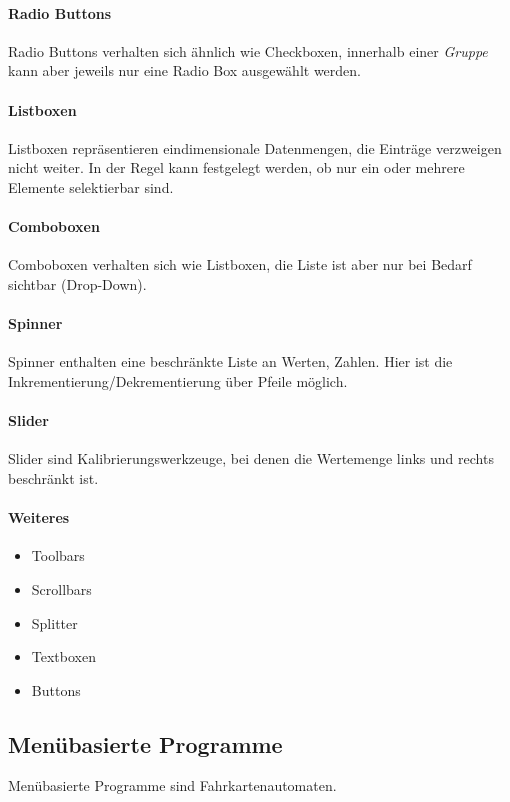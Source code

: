 					\paragraph{Radio Buttons}
						Radio Buttons verhalten sich ähnlich wie Checkboxen, innerhalb einer \emph{Gruppe} kann aber jeweils nur eine Radio Box ausgewählt werden.

					\paragraph{Listboxen}
						Listboxen repräsentieren eindimensionale Datenmengen, \dh die Einträge verzweigen nicht weiter. In der Regel kann festgelegt werden, ob nur ein oder mehrere Elemente selektierbar sind.

					\paragraph{Comboboxen}
						Comboboxen verhalten sich wie Listboxen, die Liste ist aber nur bei Bedarf sichtbar (Drop-Down).

					\paragraph{Spinner}
						Spinner enthalten eine beschränkte Liste an Werten, \zB Zahlen. Hier ist die Inkrementierung/Dekrementierung über Pfeile möglich.

					\paragraph{Slider}
						Slider sind Kalibrierungswerkzeuge, bei denen die Wertemenge links und rechts beschränkt ist.

					\paragraph{Weiteres}
						\begin{itemize}
							\item Toolbars
							\item Scrollbars
							\item Splitter
							\item Textboxen
							\item Buttons
						\end{itemize}

			\subsection{Menübasierte Programme}
				Menübasierte Programme sind \zB Fahrkartenautomaten.

